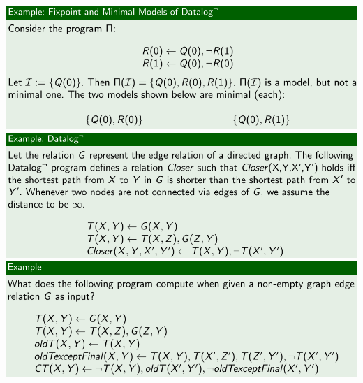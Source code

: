 \documentclass{article}
\begin{document}
\includegraphics[scale=0.3]{90.png}\\
\includegraphics[scale=0.3]{91.png}\\
\includegraphics[scale=0.3]{92.png}\\
\end{document}
